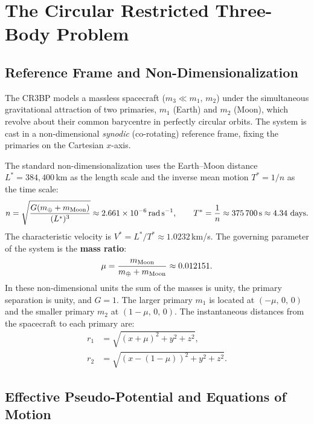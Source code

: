 \documentclass[12pt, a4paper]{article}
\begin{document}
\section{The Circular Restricted Three-Body Problem}
\label{sec:background}

\subsection{Reference Frame and Non-Dimensionalization}

The CR3BP models a massless spacecraft ($m_3 \ll m_1,\,m_2$) under the
simultaneous gravitational attraction of two primaries, $m_1$ (Earth) and
$m_2$ (Moon), which revolve about their common barycentre in perfectly
circular orbits.
The system is cast in a non-dimensional \textit{synodic} (co-rotating)
reference frame, fixing the primaries on the Cartesian $x$-axis.

The standard non-dimensionalization uses the Earth--Moon distance
$L^* = 384{,}400$\,km as the length scale and the inverse mean motion
$T^* = 1/n$ as the time scale:
\begin{equation}
  n = \sqrt{\frac{G(m_\oplus + m_{\rm Moon})}{(L^*)^3}}
  \approx \SI{2.661e-6}{\radian\per\second},
  \qquad
  T^* = \frac{1}{n} \approx \SI{375700}{\second} \approx 4.34~\text{days}.
\end{equation}
The characteristic velocity is $V^* = L^*/T^* \approx 1.0232$\,km/s.
The governing parameter of the system is the \textbf{mass ratio}:
\begin{equation}
  \mu = \frac{m_{\rm Moon}}{m_\oplus + m_{\rm Moon}} \approx 0.012151.
\end{equation}
In these non-dimensional units the sum of the masses is unity, the primary
separation is unity, and $G=1$.
The larger primary $m_1$ is located at $(-\mu,\,0,\,0)$ and the smaller
primary $m_2$ at $(1-\mu,\,0,\,0)$.
The instantaneous distances from the spacecraft to each primary are:
\begin{align}
  r_1 &= \sqrt{(x+\mu)^2 + y^2 + z^2}, \\
  r_2 &= \sqrt{(x-(1-\mu))^2 + y^2 + z^2}.
\end{align}

\subsection{Effective Pseudo-Potential and Equations of Motion}
\end{document}

